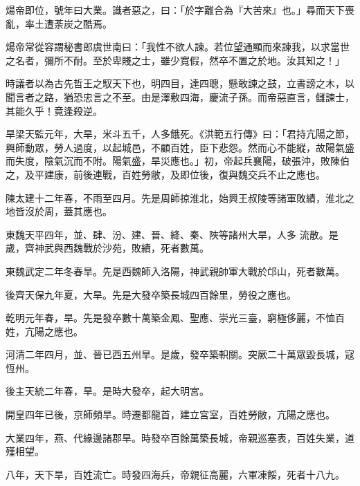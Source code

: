 \begin{pinyinscope}
 煬帝即位，號年曰大業。識者惡之，曰：「於字離合為『大苦來』也。」尋而天下喪亂，率土遭荼炭之酷焉。



 煬帝常從容謂秘書郎虞世南曰：「我性不欲人諫。若位望通顯而來諫我，以求當世之名者，彌所不耐。至於卑賤之士，雖少寬假，然卒不置之於地。汝其知之！」



 時議者以為古先哲王之馭天下也，明四目，達四聰，懸敢諫之鼓，立書謗之木，以聞言者之路，猶恐忠言之不至。由是澤敷四海，慶流子孫。而帝惡直言，讎諫士，其能久乎！竟逢殺逆。



 旱梁天監元年，大旱，米斗五千，人多餓死。《洪範五行傳》曰：「君持亢陽之節，興師動眾，勞人過度，以起城邑，不顧百姓，臣下悲怨。然而心不能縱，故陽氣盛而失度，陰氣沉而不附。陽氣盛，旱災應也。」初，帝起兵襄陽，破張沖，敗陳伯之，及平建康，前後連戰，百姓勞敝，及即位後，復與魏交兵不止之應也。



 陳太建十二年春，不雨至四月。先是周師掠淮北，始興王叔陵等諸軍敗績，淮北之地皆沒於周，蓋其應也。



 東魏天平四年，並、肆、汾、建、晉、絳、秦、陜等諸州大旱，人多
 流散。是歲，齊神武與西魏戰於沙苑，敗績，死者數萬。



 東魏武定二年冬春旱。先是西魏師入洛陽，神武親帥軍大戰於邙山，死者數萬。



 後齊天保九年夏，大旱。先是大發卒築長城四百餘里，勞役之應也。



 乾明元年春，旱。先是發卒數十萬築金鳳、聖應、崇光三臺，窮極侈麗，不恤百姓，亢陽之應也。



 河清二年四月，並、晉已西五州旱。是歲，發卒築軹關。突厥二十萬眾毀長城，寇恆州。



 後主天統二年春，旱。是時大發卒，起大明宮。



 開皇四年已後，京師頻旱。時遷都龍首，建立宮室，百姓勞敝，亢陽之應也。



 大業四年，燕、代緣邊諸郡旱。時發卒百餘萬築長城，帝親巡塞表，百姓失業，道殣相望。



 八年，天下旱，百姓流亡。時發四海兵，帝親征高麗，六軍凍餒，死者十八九。




\end{pinyinscope}
